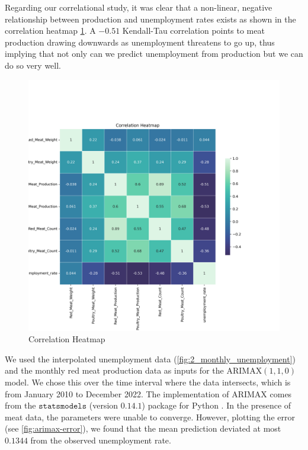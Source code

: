 \documentclass[12pt]{article}
\begin{document}
Regarding our correlational study, it was clear that a non-linear, negative relationship between production and unemployment rates exists as shown in the correlation heatmap \ref{fig:7_corr_heatmap}. A $-0.51$ Kendall-Tau correlation points to meat production drawing downwards as unemployment threatens to go up, thus implying that not only can we predict unemployment from production but we can do so very well.

\begin{figure}[H]
    \centering
    \includegraphics[width=1\linewidth]{images/Correlation Heatmap.png}
    \caption{Correlation Heatmap}
    \label{fig:7_corr_heatmap}
\end{figure}

We used the interpolated unemployment data (\ref{fig:2_monthly_unemployment}) and the monthly red meat production data as inputs for the $\mathrm{ARIMAX}(1,1,0)$ model. We chose this over the time interval where the data intersects, which is from January 2010 to December 2022.
The implementation of ARIMAX comes from the $\texttt{statsmodels}$ (version $0.14.1$) package for Python \cite{seabold2010statsmodels}. In the presence of meat data, the parameters were unable to converge. However, plotting the error (see \ref{fig:arimax-error}), we found that the mean prediction deviated at most $0.1344$ from the observed unemployment rate. 
\end{document}
